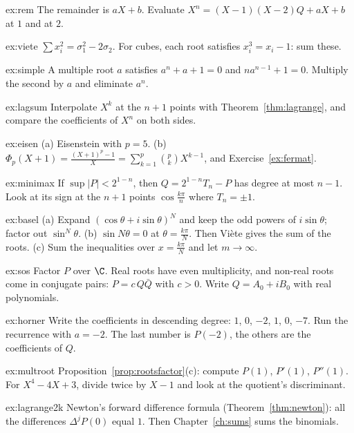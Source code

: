 \begin{hint}{ex:rem}
The remainder is $aX+b$. Evaluate $X^n=(X-1)(X-2)Q+aX+b$ at $1$ and at $2$.
\end{hint}
\begin{hint}{ex:viete}
$\sum x_i^2=\sigma_1^2-2\sigma_2$. For cubes, each root satisfies $x_i^3=x_i-1$: sum these.
\end{hint}
\begin{hint}{ex:simple}
A multiple root $a$ satisfies $a^n+a+1=0$ and $na^{n-1}+1=0$. Multiply the second by $a$ and eliminate $a^n$.
\end{hint}
\begin{hint}{ex:lagsum}
Interpolate $X^k$ at the $n+1$ points with Theorem~\ref{thm:lagrange}, and compare the coefficients of $X^n$ on both sides.
\end{hint}
\begin{hint}{ex:eisen}
(a) Eisenstein with $p=5$. (b) $\Phi_p(X+1)=\frac{(X+1)^p-1}X=\sum_{k=1}^p\binom pkX^{k-1}$, and Exercise~\ref{ex:fermat}.
\end{hint}
\begin{hint}{ex:minimax}
If $\sup|P|<2^{1-n}$, then $Q=2^{1-n}T_n-P$ has degree at most $n-1$. Look at its sign at the $n+1$ points $\cos\frac{k\pi}n$ where $T_n=\pm1$.
\end{hint}
\begin{hint}{ex:basel}
(a) Expand $(\cos\theta+i\sin\theta)^N$ and keep the odd powers of $i\sin\theta$; factor out $\sin^N\theta$. (b) $\sin N\theta=0$ at $\theta=\frac{k\pi}N$. Then Vi\`ete gives the sum of the roots. (c) Sum the inequalities over $x=\frac{k\pi}N$ and let $m\to\infty$.
\end{hint}
\begin{hint}{ex:sos}
Factor $P$ over $\C$. Real roots have even multiplicity, and non-real roots come in conjugate pairs: $P=c\,Q\bar Q$ with $c>0$. Write $Q=A_0+iB_0$ with real polynomials.
\end{hint}
\begin{hint}{ex:horner}
Write the coefficients in descending degree: $1$, $0$, $-2$, $1$, $0$, $-7$. Run the recurrence with $a=-2$. The last number is $P(-2)$, the others are the coefficients of $Q$.
\end{hint}
\begin{hint}{ex:multroot}
Proposition~\ref{prop:rootsfactor}(c): compute $P(1)$, $P'(1)$, $P''(1)$. For $X^4-4X+3$, divide twice by $X-1$ and look at the quotient's discriminant.
\end{hint}
\begin{hint}{ex:lagrange2k}
Newton's forward difference formula (Theorem~\ref{thm:newton}): all the differences $\Delta^jP(0)$ equal $1$. Then Chapter~\ref{ch:sums} sums the binomials.
\end{hint}
